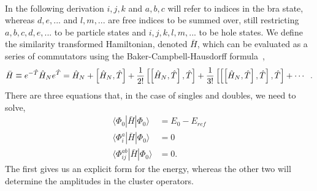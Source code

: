 \paragraph*{}
In the following derivation $i,j,k$ and $a,b,c$ will refer to indices in the bra state, whereas 
$d,e,...$ and $l,m,...$ are free indices to be summed over, still restricting $a,b,c,d,e,...$ to be particle states and $i,j,k,l,m,...$ to be hole states.
We define the similarity transformed Hamiltonian, denoted $\bar{H}$, which can be evaluated as a series of commutators using the Baker-Campbell-Hausdorff formula~\cite{CompChem.14.33},
\begin{equation}
\label{eq:CC:BCH}
\bar{H} \equiv e^{-\hat{T}} \hat{H}_N e^{\hat{T}}
=
\hat{H}_N + \left[\hat{H}_N, \hat{T} \right]
+
\frac{1}{2!} \left[\left[\hat{H}_N, \hat{T}\right], \hat{T}\right]
+
\frac{1}{3!} \left[\left[\left[\hat{H}_N, \hat{T} \right], \hat{T}\right], \hat{T}\right] + \cdots\hspace{2mm}.
\end{equation}
There are three equations that, in the case of singles and doubles, we need to solve,
\begin{equation}
\begin{split}
\langle \Phi_0 | \bar{H} | \Phi_0 \rangle &= E_0  - E_{ref} \\
\langle \Phi_{i}^a | \bar{H} | \Phi_0 \rangle &= 0 \\
\langle \Phi_{ij}^{ab} | \bar{H} | \Phi_0 \rangle &= 0 .
\end{split}
\end{equation}
The first gives us an explicit form for the energy, whereas the other two will determine the amplitudes in the cluster operators.


